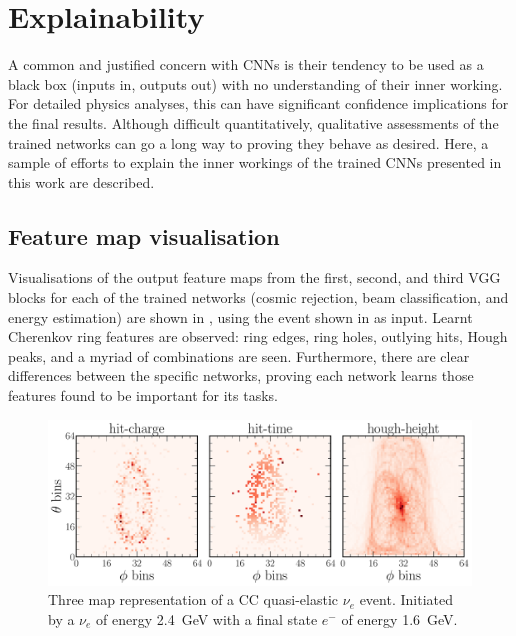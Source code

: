\section{Explainability} %
\label{sec:results_explain} %

A common and justified concern with CNNs is their tendency to be used as a black box (inputs in,
outputs out) with no understanding of their inner working. For detailed physics analyses, this can
have significant confidence implications for the final results. Although difficult quantitatively,
qualitative assessments of the trained networks can go a long way to proving they behave as
desired. Here, a sample of efforts to explain the inner workings of the trained CNNs presented in
this work are described.

\subsection{Feature map visualisation} %
\label{sec:results_explain_vis} %

Visualisations of the output feature maps from the first, second, and third VGG blocks for each of
the trained networks (cosmic rejection, beam classification, and energy estimation) are shown in
, using the event shown in 
as input. Learnt Cherenkov ring features are observed: ring edges, ring holes, outlying hits,
Hough peaks, and a myriad of combinations are seen. Furthermore, there are clear differences
between the specific networks, proving each network learns those features found to be important
for its tasks.

\begin{figure} %
    \includegraphics[width=\textwidth]{diagrams/7-results/explain_example_event.pdf}
    \caption[Example CC quasi-elastic $\nu_{e}$ event for explainability]
    {Three map representation of a CC quasi-elastic $\nu_{e}$ event. Initiated by a $\nu_{e}$ of
        energy \SI{2.4}{\GeV} with a final state $e^{-}$ of energy \SI{1.6}{\GeV}.}
    \label{fig:explain_example_event}
\end{figure}

